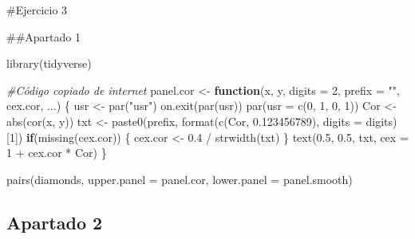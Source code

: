 \documentclass[
]{article}
\newenvironment{Shaded}{\begin{snugshade}}{\end{snugshade}}
\newcommand{\AttributeTok}[1]{\textcolor[rgb]{0.77,0.63,0.00}{#1}}
\newcommand{\CommentTok}[1]{\textcolor[rgb]{0.56,0.35,0.01}{\textit{#1}}}
\newcommand{\ControlFlowTok}[1]{\textcolor[rgb]{0.13,0.29,0.53}{\textbf{#1}}}
\newcommand{\DecValTok}[1]{\textcolor[rgb]{0.00,0.00,0.81}{#1}}
\newcommand{\FloatTok}[1]{\textcolor[rgb]{0.00,0.00,0.81}{#1}}
\newcommand{\FunctionTok}[1]{\textcolor[rgb]{0.00,0.00,0.00}{#1}}
\newcommand{\NormalTok}[1]{#1}
\newcommand{\OtherTok}[1]{\textcolor[rgb]{0.56,0.35,0.01}{#1}}
\newcommand{\SpecialCharTok}[1]{\textcolor[rgb]{0.00,0.00,0.00}{#1}}
\newcommand{\StringTok}[1]{\textcolor[rgb]{0.31,0.60,0.02}{#1}}
\begin{document}
\#Ejercicio 3

\#\#Apartado 1

\begin{Shaded}
\begin{Highlighting}[]
\FunctionTok{library}\NormalTok{(tidyverse)}

\CommentTok{\#Código copiado de internet}
\NormalTok{panel.cor }\OtherTok{\textless{}{-}} \ControlFlowTok{function}\NormalTok{(x, y, }\AttributeTok{digits =} \DecValTok{2}\NormalTok{, }\AttributeTok{prefix =} \StringTok{""}\NormalTok{, cex.cor, ...) \{}
\NormalTok{    usr }\OtherTok{\textless{}{-}} \FunctionTok{par}\NormalTok{(}\StringTok{"usr"}\NormalTok{)}
    \FunctionTok{on.exit}\NormalTok{(}\FunctionTok{par}\NormalTok{(usr))}
    \FunctionTok{par}\NormalTok{(}\AttributeTok{usr =} \FunctionTok{c}\NormalTok{(}\DecValTok{0}\NormalTok{, }\DecValTok{1}\NormalTok{, }\DecValTok{0}\NormalTok{, }\DecValTok{1}\NormalTok{))}
\NormalTok{    Cor }\OtherTok{\textless{}{-}} \FunctionTok{abs}\NormalTok{(}\FunctionTok{cor}\NormalTok{(x, y))}
\NormalTok{    txt }\OtherTok{\textless{}{-}} \FunctionTok{paste0}\NormalTok{(prefix, }\FunctionTok{format}\NormalTok{(}\FunctionTok{c}\NormalTok{(Cor, }\FloatTok{0.123456789}\NormalTok{), }\AttributeTok{digits =}\NormalTok{ digits)[}\DecValTok{1}\NormalTok{])}
    \ControlFlowTok{if}\NormalTok{(}\FunctionTok{missing}\NormalTok{(cex.cor)) \{}
\NormalTok{        cex.cor }\OtherTok{\textless{}{-}} \FloatTok{0.4} \SpecialCharTok{/} \FunctionTok{strwidth}\NormalTok{(txt)}
\NormalTok{    \}}
    \FunctionTok{text}\NormalTok{(}\FloatTok{0.5}\NormalTok{, }\FloatTok{0.5}\NormalTok{, txt,}
         \AttributeTok{cex =} \DecValTok{1} \SpecialCharTok{+}\NormalTok{ cex.cor }\SpecialCharTok{*}\NormalTok{ Cor)}
\NormalTok{\}}


\FunctionTok{pairs}\NormalTok{(diamonds,}
      \AttributeTok{upper.panel =}\NormalTok{ panel.cor,}
      \AttributeTok{lower.panel =}\NormalTok{ panel.smooth)}
\end{Highlighting}
\end{Shaded}

\hypertarget{apartado-2-1}{%
\subsection{Apartado 2}\label{apartado-2-1}}
\end{document}
